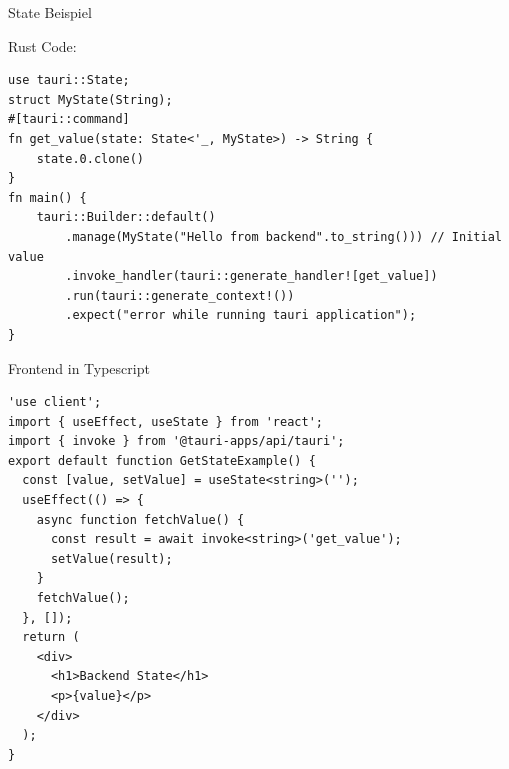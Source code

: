 \LARGE
State Beispiel
\label{subsec:state-example}
\large

Rust Code:

\begin{verbatim}
use tauri::State;
struct MyState(String);
#[tauri::command]
fn get_value(state: State<'_, MyState>) -> String {
    state.0.clone()
}
fn main() {
    tauri::Builder::default()
        .manage(MyState("Hello from backend".to_string())) // Initial value
        .invoke_handler(tauri::generate_handler![get_value])
        .run(tauri::generate_context!())
        .expect("error while running tauri application");
}
\end{verbatim}

Frontend in Typescript

\begin{verbatim}
'use client';
import { useEffect, useState } from 'react';
import { invoke } from '@tauri-apps/api/tauri';
export default function GetStateExample() {
  const [value, setValue] = useState<string>('');
  useEffect(() => {
    async function fetchValue() {
      const result = await invoke<string>('get_value');
      setValue(result);
    }
    fetchValue();
  }, []);
  return (
    <div>
      <h1>Backend State</h1>
      <p>{value}</p>
    </div>
  );
}
\end{verbatim}


